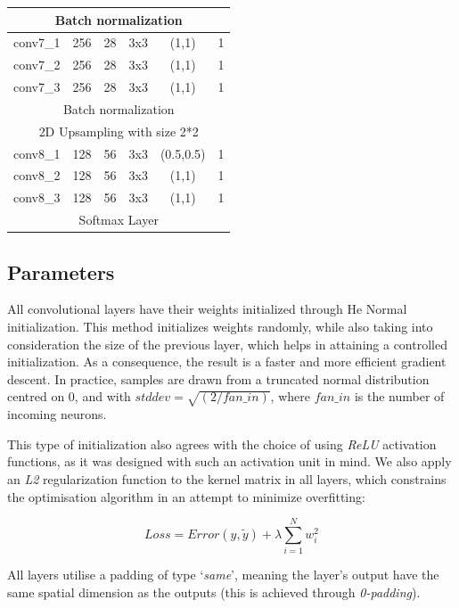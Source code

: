 \documentclass[twoside,twocolumn]{article}
\begin{document}
\begin{table} [h!]
\begin{tabular}{|c|c|c|c|c|c|}
	\multicolumn{6}{|c|}{Batch normalization}\\ \hline
	\rowcolor{gray!15}
	conv7\_1 & 256 & 28 & 3x3 & (1,1) & 1 \\ 
	conv7\_2 & 256 & 28 & 3x3 & (1,1) & 1 \\ 
	\rowcolor{gray!15}
	conv7\_3 & 256 & 28 & 3x3 & (1,1) & 1 \\ \hline
	\multicolumn{6}{|c|}{Batch normalization}\\ \hline
	\multicolumn{6}{|c|}{2D Upsampling with size 2*2}\\ \hline
	\rowcolor{gray!15}
	conv8\_1 & 128 & 56 & 3x3 & (0.5,0.5)\footnotemark & 1 \\ 
	conv8\_2 & 128 & 56 & 3x3 & (1,1) & 1 \\ 
	\rowcolor{gray!15}
	conv8\_3 & 128 & 56 & 3x3 & (1,1) & 1 \\ \hline
	\multicolumn{6}{|c|}{Softmax Layer}\\ \hline

\end{tabular}
\end{table}



\subsection{Parameters}

All convolutional layers have their weights initialized through He Normal \cite{Kaiming:2015} initialization. This method initializes weights randomly, while also taking into consideration the size of the previous layer, which helps in attaining a controlled initialization. As a consequence, the result is a faster and more efficient gradient descent. In practice, samples are drawn from a truncated normal distribution centred on 0, and with $stddev=\sqrt{(2/fan\_in)}$, where $fan\_in$ is the number of incoming neurons.

This type of initialization also agrees with the choice of using \textit{ReLU} activation functions, as it was designed with such an activation unit in mind. We also apply an \textit{L2} regularization function to the kernel matrix in all layers, which constrains the optimisation algorithm in an attempt to minimize overfitting:

\begin{equation}
Loss = Error(y,\tilde{y}) + \lambda\sum_{i=1}^{N} w_i^2
\end{equation}

All layers utilise a padding of type ‘\textit{same}’, meaning the layer’s output have the same spatial dimension as the outputs (this is achieved through \textit{0-padding}).
\end{document}
